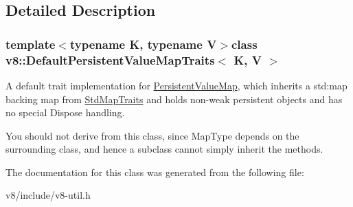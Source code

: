 \subsection{Detailed Description}
\subsubsection*{template$<$typename K, typename V$>$class v8\-::\-Default\-Persistent\-Value\-Map\-Traits$<$ K, V $>$}

A default trait implementation for \hyperlink{classv8_1_1PersistentValueMap}{Persistent\-Value\-Map}, which inherits a std\-:map backing map from \hyperlink{classv8_1_1StdMapTraits}{Std\-Map\-Traits} and holds non-\/weak persistent objects and has no special Dispose handling.

You should not derive from this class, since Map\-Type depends on the surrounding class, and hence a subclass cannot simply inherit the methods. 

The documentation for this class was generated from the following file\-:\begin{DoxyCompactItemize}
\item 
v8/include/v8-\/util.\-h\end{DoxyCompactItemize}
